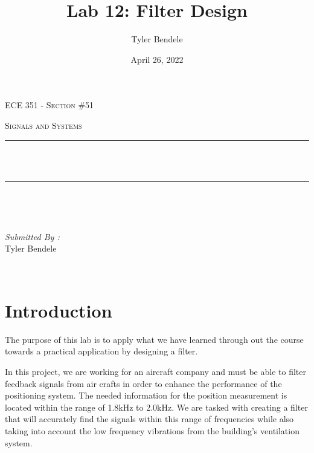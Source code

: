 \documentclass[12pt]{report}
\title{Lab 12: Filter Design}
\author{Tyler Bendele}
\date{April 26, 2022}
\makeatletter
\let\thetitle\@title
\makeatother
\begin{document}
\begin{titlepage}
\centering
\vspace*{0.5 cm}

\begin{center}    \textsc{\Large   ECE 351 - Section \#51 }\\[2.0 cm]
\end{center}%
\textsc{\Large Signals and Systems  }\\[0.5 cm] %

\rule{\linewidth}{0.2 mm} \\[0.4 cm]
{ \huge \bfseries \thetitle}\\
\rule{\linewidth}{0.2 mm} \\[1.5 cm]
\begin{minipage}{0.4\textwidth}
\begin{flushleft} \large
\end{flushleft}
\end{minipage}~
\begin{minipage}{0.4\textwidth}
\begin{flushright} \large
\emph{Submitted By :} \\
Tyler Bendele
\end{flushright}
\end{minipage}\\[2 cm]
\end{titlepage}
\tableofcontents
\pagebreak
\renewcommand{\thesection}{\arabic{section}}
\section{Introduction}
The purpose of this lab is to apply what we have learned through out the
course towards a practical application by designing a filter.

In this project, we are working for an aircraft company and must be able to
filter feedback signals from air crafts in order to enhance 
the performance of the positioning system. The needed information for the
position measurement is located within the range of 1.8kHz to 2.0kHz. We
are tasked with creating a filter that will accurately find the signals
within this range of frequencies while also taking into account the low
frequency vibrations from the building's ventilation system.
\end{document}
